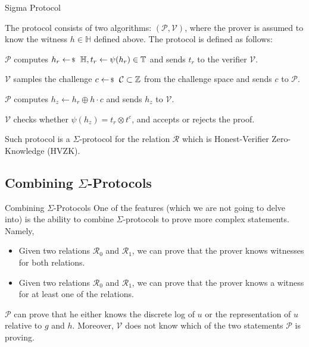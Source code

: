 \documentclass{zkdl-presentation-template}
\begin{document}
    \begin{frame}{Sigma Protocol}
        \begin{definition}
            The protocol consists of two algorithms: $(\mathcal{P}, \mathcal{V})$, where the prover is assumed to know the witness $h \in \mathbb{H}$ defined above. The protocol is defined as follows:\pause
            \begin{algoen}
                \item $\mathcal{P}$ computes $h_r \leftarrowS \mathbb{H}, t_r \gets \psi(h_r) \in \mathbb{T}$ and sends $t_r$ to the verifier $\mathcal{V}$.\pause
                \item $\mathcal{V}$ samples the challenge $c \leftarrowS \mathcal{C} \subset \mathbb{Z}$ from the challenge space and sends $c$ to $\mathcal{P}$.\pause
                \item $\mathcal{P}$ computes $h_z \gets h_r \oplus h\cdot c$ and sends $h_z$ to $\mathcal{V}$.\pause
                \item $\mathcal{V}$ checks whether $\psi(h_z) = t_r \otimes t^c$, and accepts or rejects the proof.\pause
            \end{algoen}
        \end{definition}

        \begin{theorem}
            Such protocol is a $\Sigma$-protocol for the relation $\mathcal{R}$ which is Honest-Verifier Zero-Knowledge (HVZK).
        \end{theorem}
    \end{frame}

    \subsection{Combining $\Sigma$-Protocols}

    \begin{frame}{Combining $\Sigma$-Protocols}
        One of the features (which we are not going to delve into) is the ability to combine $\Sigma$-protocols to prove more complex statements.\pause{} Namely,
        \begin{itemize}
            \item Given two relations $\mathcal{R}_0$ and $\mathcal{R}_1$, we can prove that the prover knows witnesses for both relations.\pause
            \item Given two relations $\mathcal{R}_0$ and $\mathcal{R}_1$, we can prove that the prover knows a witness for at least one of the relations.\pause
        \end{itemize}

        \begin{example}
            $\mathcal{P}$ can prove that he either knows the discrete log of $u$ or the representation of $u$ relative to $g$ and $h$. Moreover, $\mathcal{V}$ does not know which of the two statements $\mathcal{P}$ is proving.
        \end{example}
    \end{frame}
\end{document}
